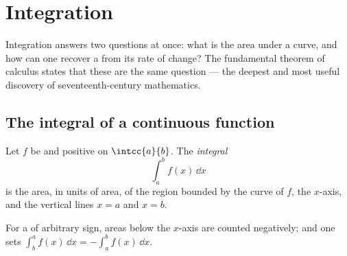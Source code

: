 \chapter{Integration}\label{ch:g12:integ}

Integration answers two questions at once: what is the area under a curve,
and how can one recover a  from its rate of change? The fundamental
theorem of calculus states that these are the same question --- the deepest
and most useful discovery of seventeenth-century mathematics.

\section{The integral of a continuous function}

\begin{definition}\label{def:g12:integ:area}
Let $f$ be  and positive on $\intcc{a}{b}$. The
\emph{integral}
\[
\int_a^b f(x)\,\dd x
\]
is the area, in units of area, of the region bounded by the curve of $f$,
the $x$-axis, and the vertical lines $x = a$ and $x = b$.
\end{definition}

\begin{omfigure}
\end{omfigure}

For a  of arbitrary sign, areas below the $x$-axis are counted
negatively; and one sets
$\int_b^a f(x)\,\dd x = -\int_a^b f(x)\,\dd x$.

